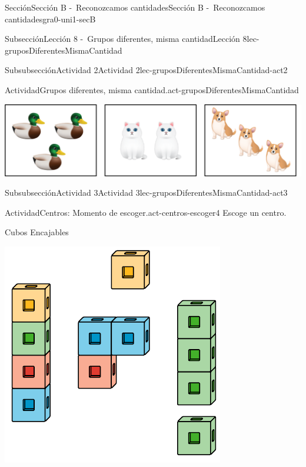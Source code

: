 \documentclass[twoside,10pt,]{article}
\begin{document}
\begin{sectionptx}{Sección}{Sección B -~Reconozcamos cantidades}{}{Sección B -~Reconozcamos cantidades}{}{}{gra0-uni1-secB}
\begin{subsectionptx}{Subsección}{Lección 8 -~Grupos diferentes, misma cantidad}{}{Lección 8}{}{}{lec-gruposDiferentesMismaCantidad}
%
\begin{subsubsectionptx}{Subsubsección}{Actividad 2}{}{Actividad 2}{}{}{lec-gruposDiferentesMismaCantidad-act2}
\begin{activity}{Actividad}{Grupos diferentes, misma cantidad.}{act-gruposDiferentesMismaCantidad}%
\begin{image}{0}{1}{0}{}%
\includegraphics[width=\linewidth]{external/png-source/K.1.C Beta Student Workbook.AnimalGroups.png}
\end{image}%
%
\end{activity}%
\end{subsubsectionptx}
%
%
\typeout{************************************************}
\typeout{************************************************}
%
\begin{subsubsectionptx}{Subsubsección}{Actividad 3}{}{Actividad 3}{}{}{lec-gruposDiferentesMismaCantidad-act3}
\begin{activity}{Actividad}{Centros: Momento de escoger.}{act-centros-escoger4}%
Escoge un centro.%
\begin{sidebyside}{2}{0.025}{0.025}{0.05}%
\begin{sbspanel}{0.45}%
Cubos Encajables%
\par
\includegraphics[width=\linewidth]{external/svg-source/tikz-file-128850.pdf}

\end{sbspanel}
\end{sidebyside}
\end{activity}
\end{subsubsectionptx}
\end{subsectionptx}
\end{sectionptx}
\end{document}
